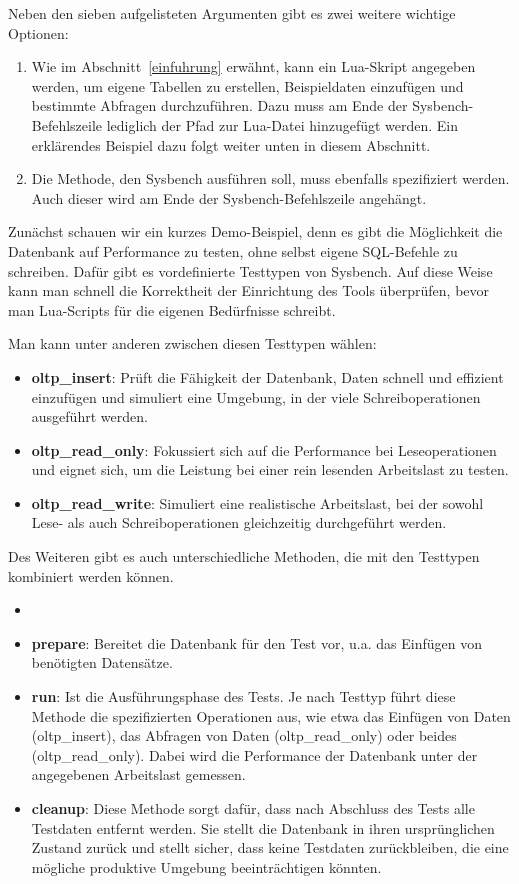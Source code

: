Neben den sieben aufgelisteten Argumenten gibt es zwei weitere wichtige Optionen:
\begin{enumerate}
    \item Wie im Abschnitt~\ref{einfuhrung} erwähnt, kann ein Lua-Skript angegeben werden, um eigene
    Tabellen zu erstellen, Beispieldaten einzufügen und bestimmte Abfragen durchzuführen.
    Dazu muss am Ende der Sysbench-Befehlszeile lediglich der Pfad zur Lua-Datei hinzugefügt werden.
    Ein erklärendes Beispiel dazu folgt weiter unten in diesem Abschnitt.
    \item Die Methode, den Sysbench ausführen soll, muss ebenfalls spezifiziert werden.
    Auch dieser wird am Ende der Sysbench-Befehlszeile angehängt.
\end{enumerate}

Zunächst schauen wir ein kurzes Demo-Beispiel, denn es gibt die Möglichkeit die Datenbank
auf Performance zu testen, ohne selbst eigene SQL-Befehle zu schreiben. Dafür gibt es vordefinierte Testtypen von Sysbench.
Auf diese Weise kann man schnell die Korrektheit der Einrichtung des Tools überprüfen, bevor man Lua-Scripts
für die eigenen Bedürfnisse schreibt.

Man kann unter anderen zwischen diesen Testtypen wählen:
\begin{itemize}
    \item \textbf{oltp\_insert}: Prüft die Fähigkeit der Datenbank, Daten schnell und effizient einzufügen und
    simuliert eine Umgebung, in der viele Schreiboperationen ausgeführt werden.
    \item \textbf{oltp\_read\_only}: Fokussiert sich auf die Performance bei Leseoperationen und
    eignet sich, um die Leistung bei einer rein lesenden Arbeitslast zu testen.
    \item \textbf{oltp\_read\_write}: Simuliert eine realistische Arbeitslast, bei der sowohl Lese- als
    auch Schreiboperationen gleichzeitig durchgeführt werden.
\end{itemize}

Des Weiteren gibt es auch unterschiedliche Methoden, die mit den Testtypen kombiniert werden können.

\begin{itemize}
    \item \item \textbf{prepare}: Bereitet die Datenbank für den Test vor, u.a. das Einfügen von benötigten Datensätze.
    \item \textbf{run}: Ist die Ausführungsphase des Tests. Je nach Testtyp führt diese Methode die spezifizierten Operationen aus,
    wie etwa das Einfügen von Daten (oltp\_insert), das Abfragen von Daten (oltp\_read\_only) oder beides (oltp\_read\_only).
    Dabei wird die Performance der Datenbank unter der angegebenen Arbeitslast gemessen.
    \item \textbf{cleanup}: Diese Methode sorgt dafür, dass nach Abschluss des Tests alle Testdaten entfernt werden.
    Sie stellt die Datenbank in ihren ursprünglichen Zustand zurück und stellt sicher,
    dass keine Testdaten zurückbleiben, die eine mögliche produktive Umgebung beeinträchtigen könnten.
\end{itemize}

